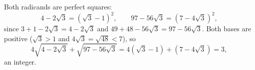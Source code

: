 Both radicands are perfect squares:
\[
4-2\sqrt3=(\sqrt3-1)^2,\qquad 97-56\sqrt3=(7-4\sqrt3)^2 ,
\]
since $3+1-2\sqrt3=4-2\sqrt3$ and $49+48-56\sqrt3=97-56\sqrt3$. Both bases are positive ($\sqrt3>1$ and $4\sqrt3=\sqrt{48}<7$), so
\[
4\sqrt{4-2\sqrt3}+\sqrt{97-56\sqrt3}=4(\sqrt3-1)+(7-4\sqrt3)=\boxed{3},
\]
an integer.
